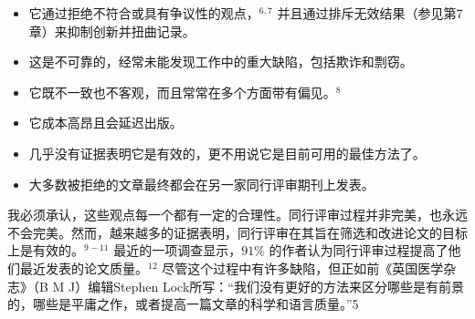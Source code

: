 \begin{itemize}
\item 它通过拒绝不符合或具有争议性的观点，${ }^{6,7}$ 并且通过排斥无效结果（参见第7章）来抑制创新并扭曲记录。
\item 这是不可靠的，经常未能发现工作中的重大缺陷，包括欺诈和剽窃。
\item 它既不一致也不客观，而且常常在多个方面带有偏见。${ }^{8}$
\item 它成本高昂且会延迟出版。
\item 几乎没有证据表明它是有效的，更不用说它是目前可用的最佳方法了。
\item 大多数被拒绝的文章最终都会在另一家同行评审期刊上发表。
\end{itemize}

我必须承认，这些观点每一个都有一定的合理性。同行评审过程并非完美，也永远不会完美。然而，越来越多的证据表明，同行评审在其旨在筛选和改进论文的目标上是有效的。${ }^{9-11}$ 最近的一项调查显示，$91 \%$ 的作者认为同行评审过程提高了他们最近发表的论文质量。${ }^{12}$ 尽管这个过程中有许多缺陷，但正如前《英国医学杂志》（B M J）编辑Stephen Lock所写：“我们没有更好的方法来区分哪些是有前景的，哪些是平庸之作，或者提高一篇文章的科学和语言质量。”5

